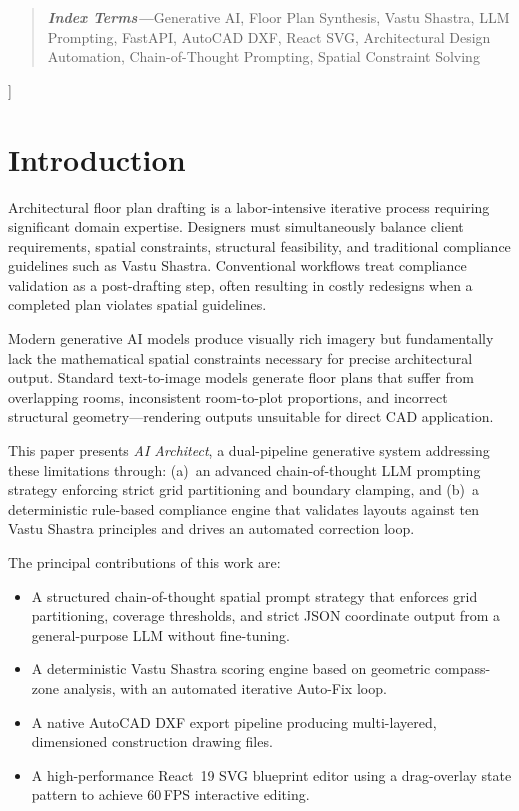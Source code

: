 \documentclass[10pt, twocolumn, letterpaper]{article}
\begin{document}
\begin{center}
\begin{quote}
  \vspace{4pt}
  \noindent\textbf{\textit{Index Terms---}}Generative AI, Floor Plan Synthesis,
  Vastu Shastra, LLM Prompting, FastAPI, AutoCAD DXF, React SVG, Architectural
  Design Automation, Chain-of-Thought Prompting, Spatial Constraint Solving
  \end{quote}

  \vspace{10pt}
  \end{center}
  ]%

  \section{Introduction}

  Architectural floor plan drafting is a labor-intensive iterative process
  requiring significant domain expertise. Designers must simultaneously balance
  client requirements, spatial constraints, structural feasibility, and
  traditional compliance guidelines such as Vastu Shastra. Conventional
  workflows treat compliance validation as a post-drafting step, often resulting
  in costly redesigns when a completed plan violates spatial guidelines.

  Modern generative AI models produce visually rich imagery but fundamentally
  lack the mathematical spatial constraints necessary for precise architectural
  output. Standard text-to-image models generate floor plans that suffer from
  overlapping rooms, inconsistent room-to-plot proportions, and incorrect
  structural geometry---rendering outputs unsuitable for direct CAD application.

  This paper presents \textit{AI Architect}, a dual-pipeline generative system
  addressing these limitations through: (a)~an advanced chain-of-thought LLM
  prompting strategy enforcing strict grid partitioning and boundary clamping,
  and (b)~a deterministic rule-based compliance engine that validates layouts
  against ten Vastu Shastra principles and drives an automated correction loop.

  The principal contributions of this work are:
  \begin{itemize}[leftmargin=*, itemsep=0pt, topsep=2pt]
    \item A structured chain-of-thought spatial prompt strategy that enforces
          grid partitioning, coverage thresholds, and strict JSON coordinate
          output from a general-purpose LLM without fine-tuning.
    \item A deterministic Vastu Shastra scoring engine based on geometric
          compass-zone analysis, with an automated iterative Auto-Fix loop.
    \item A native AutoCAD DXF export pipeline producing multi-layered,
          dimensioned construction drawing files.
    \item A high-performance React~19 SVG blueprint editor using a
          drag-overlay state pattern to achieve 60\,FPS interactive editing.
  \end{itemize}
\end{document}
